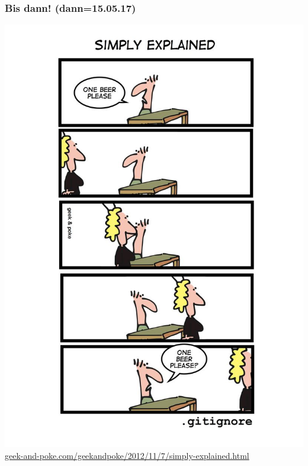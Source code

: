 \documentclass[18pt]{beamer}
\begin{document}
		\begin{frame}
			\frametitle{Bis dann! (dann=15.05.17)}
			\centering
			\includegraphics[height=0.85\textheight]{./comics/geek_and_poke_gitignore.jpg}
			\tiny\url{geek-and-poke.com/geekandpoke/2012/11/7/simply-explained.html}
		\end{frame}
\end{document}
